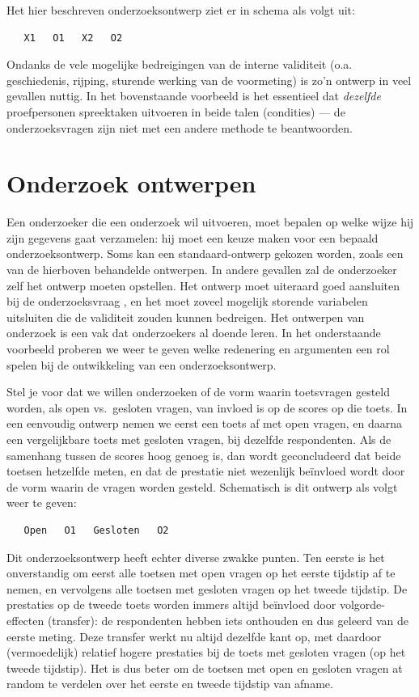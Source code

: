 \documentclass[
]{book}
\begin{document}
Het hier beschreven onderzoeksontwerp ziet er in schema als volgt uit:

\begin{verbatim}
   X1   O1   X2   O2
\end{verbatim}

Ondanks de vele mogelijke bedreigingen van de interne validiteit (o.a.
geschiedenis, rijping, sturende werking van de voormeting) is zo'n
ontwerp in veel gevallen nuttig. In het bovenstaande voorbeeld is het
essentieel dat \emph{dezelfde} proefpersonen spreektaken uitvoeren in beide
talen (condities) --- de onderzoeksvragen zijn niet met een andere
methode te beantwoorden.

\hypertarget{onderzoek-ontwerpen}{%
\section{Onderzoek ontwerpen}\label{onderzoek-ontwerpen}}

Een onderzoeker die een onderzoek wil uitvoeren, moet bepalen op welke
wijze hij zijn gegevens gaat verzamelen: hij moet een keuze maken voor
een bepaald onderzoeksontwerp. Soms kan een standaard-ontwerp gekozen
worden, zoals een van de hierboven behandelde ontwerpen. In andere
gevallen zal de onderzoeker zelf het ontwerp moeten opstellen. Het
ontwerp moet uiteraard goed aansluiten bij de onderzoeksvraag
\citep{Levin99}, en het moet zoveel mogelijk storende variabelen uitsluiten
die de validiteit zouden kunnen bedreigen. Het ontwerpen van onderzoek
is een vak dat onderzoekers al doende leren. In het onderstaande
voorbeeld proberen we weer te geven welke redenering en argumenten een
rol spelen bij de ontwikkeling van een onderzoeksontwerp.

Stel je voor dat we willen onderzoeken of de vorm waarin toetsvragen
gesteld worden, als open vs.~gesloten vragen, van invloed is op de
scores op die toets. In een eenvoudig ontwerp nemen we eerst een toets
af met open vragen, en daarna een vergelijkbare toets met gesloten
vragen, bij dezelfde respondenten. Als de samenhang tussen de scores
hoog genoeg is, dan wordt geconcludeerd dat beide toetsen hetzelfde
meten, en dat de prestatie niet wezenlijk beïnvloed wordt door de vorm
waarin de vragen worden gesteld. Schematisch is dit ontwerp als volgt
weer te geven:

\begin{verbatim}
   Open   O1   Gesloten   O2
\end{verbatim}

Dit onderzoeksontwerp heeft echter diverse zwakke punten. Ten eerste is
het onverstandig om eerst alle toetsen met open vragen op het eerste
tijdstip af te nemen, en vervolgens alle toetsen met gesloten vragen op
het tweede tijdstip. De prestaties op de tweede toets worden immers
altijd beïnvloed door volgorde-effecten (transfer): de respondenten
hebben iets onthouden en dus geleerd van de eerste meting. Deze transfer
werkt nu altijd dezelfde kant op, met daardoor (vermoedelijk) relatief
hogere prestaties bij de toets met gesloten vragen (op het tweede
tijdstip). Het is dus beter om de toetsen met open en gesloten vragen at
random te verdelen over het eerste en tweede tijdstip van afname.
\end{document}
